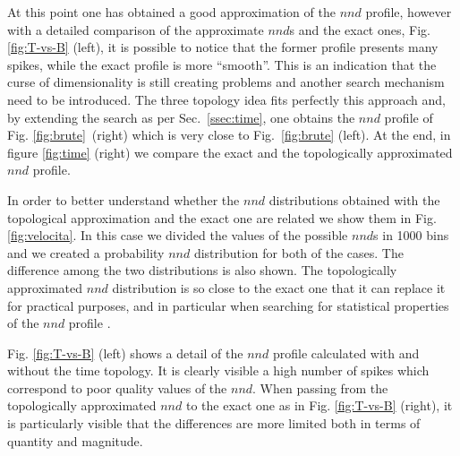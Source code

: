 \documentclass[a4paper,twoside]{article}
\begin{document}
%
At this point one has obtained a good approximation of the $nnd$ profile, however with a detailed comparison of the approximate $nnd$s and the exact ones, Fig. \ref{fig:T-vs-B} (left), it is possible to notice that the former profile presents many spikes, while the exact profile is more ``smooth''. This is an indication that the curse of dimensionality is still creating problems and another search mechanism need to be introduced. The three topology idea fits perfectly this approach and, by extending the search as per Sec.~\ref{ssec:time}, one obtains the $nnd$ profile of Fig. \ref{fig:brute}~(right) which is very close to Fig.~\ref{fig:brute} (left).
At the end, in figure \ref{fig:time} (right) we compare the exact and the topologically approximated $nnd$ profile.  


%

In order to better understand whether the $nnd$ distributions obtained with the topological approximation and the exact one are related we show them in Fig. \ref{fig:velocita}. In this case we divided the values of the possible $nnd$s in 1000 bins and we created a probability $nnd$ distribution for both of the cases. The difference among the two distributions is also shown. The topologically  approximated $nnd$ distribution is so close to the exact one that it can replace it for practical purposes, and in particular when searching for statistical properties of the $nnd$ profile \cite{sod}.

%
Fig. \ref{fig:T-vs-B} (left) shows a detail of the $nnd$ profile calculated with and without the time topology. It is clearly visible a high number of spikes which correspond to poor quality values of the $nnd$. 
When passing from the topologically approximated $nnd$ to the exact one as in 
 Fig. \ref{fig:T-vs-B} (right), it is particularly visible that the differences are more limited both in terms of quantity and magnitude.
\end{document}
